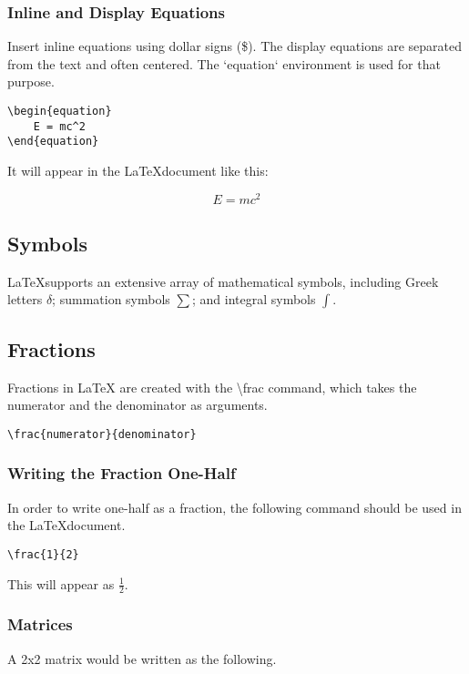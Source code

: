 \documentclass[12pt,journal,compsoc]{IEEEtran}
\begin{document}
\subsubsection{Inline and Display Equations}
Insert inline equations using dollar signs (\$). The display equations are separated from the text and often centered. The `equation` environment is used for that purpose.

\begin{verbatim}
\begin{equation}
    E = mc^2
\end{equation}
\end{verbatim}

It will appear in the \LaTeX document like this:

\begin{equation}
    E = mc^2
\end{equation}

\subsection{Symbols}
\LaTeX supports an extensive array of mathematical symbols, including Greek letters \( \delta \); summation symbols \( \sum \); and integral symbols \( \int \).

\subsection{Fractions}
Fractions in LaTeX are created with the \textbackslash frac{} command, which takes the numerator and the denominator as arguments. 

\begin{verbatim}
\frac{numerator}{denominator}
\end{verbatim}

\subsubsection{Writing the Fraction One-Half}
In order to write one-half as a fraction, the following command should be used in the \LaTeX document. 
\begin{verbatim}
\frac{1}{2}
\end{verbatim}

This will appear as \( \frac{1}{2} \). 

\subsubsection{Matrices}
A 2x2 matrix would be written as the following. 
\end{document}
